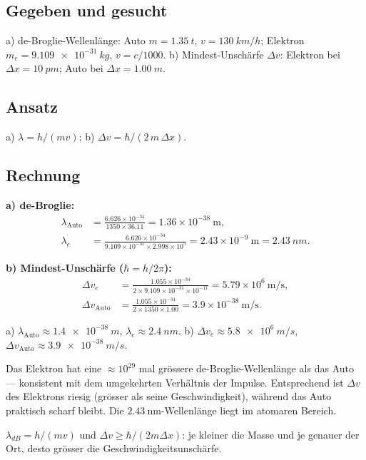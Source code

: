 
\subsection*{Gegeben und gesucht}
a) de-Broglie-Wellenlänge: Auto $m = \qty{1.35}{t}$, $v = \qty{130}{km/h}$;
Elektron $m_e = \qty{9.109e-31}{kg}$, $v = c/1000$.
b) Mindest-Unschärfe $\Delta v$: Elektron bei $\Delta x = \qty{10}{pm}$;
Auto bei $\Delta x = \qty{1.00}{m}$.

\subsection*{Ansatz}
a) $\lambda = h/(mv)$; b) $\Delta v = \hbar/(2\,m\,\Delta x)$.

\subsection*{Rechnung}
\textbf{a) de-Broglie:}
\begin{align*}
  \lambda_{\text{Auto}} &=
  \frac{6.626\times10^{-34}}{1350 \times 36.11}
  = 1.36\times10^{-38}\ \mathrm{m}, \\[2pt]
  \lambda_{e} &=
  \frac{6.626\times10^{-34}}{9.109\times10^{-31}\times 2.998\times10^5}
  = 2.43\times10^{-9}\ \mathrm{m} = \qty{2.43}{nm}.
\end{align*}

\textbf{b) Mindest-Unschärfe ($\hbar= h/2\pi$):}
\begin{align*}
  \Delta v_{e} &= \frac{1.055\times10^{-34}}{2\times 9.109\times10^{-31}
        \times 10^{-11}}
  = 5.79\times10^{6}\ \mathrm{m/s}, \\[2pt]
  \Delta v_{\text{Auto}} &= \frac{1.055\times10^{-34}}{2\times 1350 \times 1.00}
  = 3.9\times10^{-38}\ \mathrm{m/s}.
\end{align*}

\begin{ergebnis}
a) $\lambda_{\text{Auto}} \approx \qty{1.4e-38}{m}$,
$\lambda_{e} \approx \qty{2.4}{nm}$.
b) $\Delta v_{e} \approx \qty{5.8e6}{m/s}$,
$\Delta v_{\text{Auto}} \approx \qty{3.9e-38}{m/s}$.
\end{ergebnis}

\begin{kontrolle}
Das Elektron hat eine $\approx 10^{29}$ mal grössere de-Broglie-Wellenlänge
als das Auto --- konsistent mit dem umgekehrten Verhältnis der Impulse.
Entsprechend ist $\Delta v$ des Elektrons riesig (grösser als seine
Geschwindigkeit), während das Auto praktisch scharf bleibt. Die
$2.43\ \mathrm{nm}$-Wellenlänge liegt im atomaren Bereich.
\end{kontrolle}

\begin{merksatz}
$\lambda_{dB} = h/(mv)$ und $\Delta v \ge \hbar/(2m\Delta x)$: je kleiner die
Masse und je genauer der Ort, desto grösser die Geschwindigkeitsunschärfe.
\end{merksatz}
